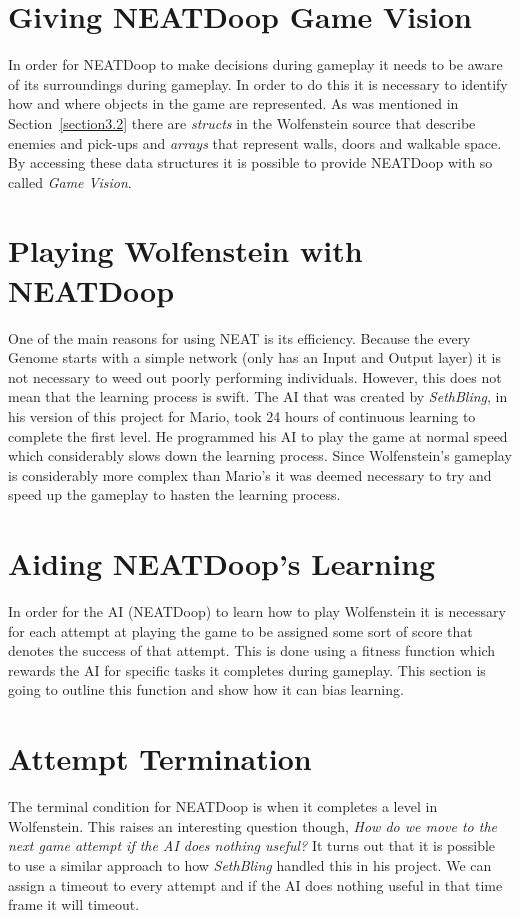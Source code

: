 \documentclass[]{Learning-to-Play-Wolfenstein-thesis}
\begin{document}
\section{Giving NEATDoop Game Vision}
In order for NEATDoop to make decisions during gameplay it needs to be aware of its surroundings during gameplay. In order to do this it is necessary to identify how and where objects in the game are represented. As was mentioned in Section~\ref{section3.2} there are \textit{structs} in the Wolfenstein source that describe enemies and pick-ups and \textit{arrays} that represent walls, doors and walkable space. By accessing these data structures it is possible to provide NEATDoop with so called \textit{Game Vision}.

\section{Playing Wolfenstein with NEATDoop}	%
One of the main reasons for using NEAT is its efficiency. Because the every Genome starts with a simple network (only has an Input and Output layer) it is not necessary to weed out poorly performing individuals. However, this does not mean that the learning process is swift. The AI that was created by \textit{SethBling}, in his version of this project for Mario, took 24 hours of continuous learning to complete the first level. He programmed his AI to play the game at normal speed which considerably slows down the learning process. Since Wolfenstein's gameplay is considerably more complex than Mario's it was deemed necessary to try and speed up the gameplay to hasten the learning process.

\section{Aiding NEATDoop's Learning}
In order for the AI (NEATDoop) to learn how to play Wolfenstein it is necessary for each attempt at playing the game to be assigned some sort of score that denotes the success of that attempt. This is done using a fitness function which rewards the AI for specific tasks it completes during gameplay. This section is going to outline this function and show how it can bias learning.

\section{Attempt Termination}
The terminal condition for NEATDoop is when it completes a level in Wolfenstein. This raises an interesting question though, \textit{How do we move to the next game attempt if the AI does nothing useful?} It turns out that it is possible to use a similar approach to how \textit{SethBling} handled this in his project. We can assign a timeout to every attempt and if the AI does nothing useful in that time frame it will timeout.
\end{document}
